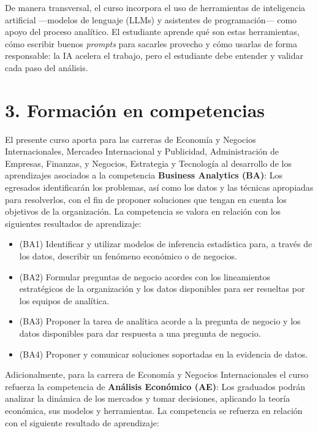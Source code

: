 \documentclass[11pt,a4paper]{article}
\begin{document}
\vspace{0.3cm}

De manera transversal, el curso incorpora el uso de herramientas de inteligencia artificial ---modelos de lenguaje (LLMs) y asistentes de programación--- como apoyo del proceso analítico. El estudiante aprende qué son estas herramientas, cómo escribir buenos \textit{prompts} para sacarles provecho y cómo usarlas de forma responsable: la IA acelera el trabajo, pero el estudiante debe entender y validar cada paso del análisis.

\section*{3. Formación en competencias}

El presente curso aporta para las carreras de Economía y Negocios Internacionales, Mercadeo Internacional y Publicidad, Administración de Empresas, Finanzas, y Negocios, Estrategia y Tecnología al desarrollo de los aprendizajes asociados a la competencia \textbf{Business Analytics (BA)}: Los egresados identificarán los problemas, así como los datos y las técnicas apropiadas para resolverlos, con el fin de proponer soluciones que tengan en cuenta los objetivos de la organización. La competencia se valora en relación con los siguientes resultados de aprendizaje:

\begin{itemize}
    \item (BA1) Identificar y utilizar modelos de inferencia estadística para, a través de los datos, describir un fenómeno económico o de negocios.
    \item (BA2) Formular preguntas de negocio acordes con los lineamientos estratégicos de la organización y los datos disponibles para ser resueltas por los equipos de analítica.
    \item (BA3) Proponer la tarea de analítica acorde a la pregunta de negocio y los datos disponibles para dar respuesta a una pregunta de negocio.
    \item (BA4) Proponer y comunicar soluciones soportadas en la evidencia de datos.
\end{itemize}

\vspace{0.3cm}

Adicionalmente, para la carrera de Economía y Negocios Internacionales el curso refuerza la competencia de \textbf{Análisis Económico (AE)}: Los graduados podrán analizar la dinámica de los mercados y tomar decisiones, aplicando la teoría económica, sus modelos y herramientas. La competencia se refuerza en relación con el siguiente resultado de aprendizaje:
\end{document}
